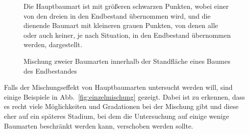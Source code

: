 \documentclass[twocolumn]{scrartcl}
\begin{document}
\begin{figure}[htbp]
  \centering
{}
\caption{Mischung zweier Baumarten innerhalb der Standfläche eines Baumes des Endbestandes}
\footnotesize{Die Hauptbaumart ist mit größeren schwarzen Punkten, wobei einer von den dreien in den Endbestand übernommen wird, und die dienende Baumart mit kleineren grauen Punkten, von denen alle oder auch keiner, je nach Situation, in den Endbestand übernommen werden, dargestellt.}
\label{fig:mischung}
\end{figure}

Falls der Mischungseffekt von Hauptbaumarten untersucht werden will, sind einige
Beispiele in Abb.~\ref{fig:einzelmischung} gezeigt. Dabei ist zu erkennen, dass
es recht viele Möglichkeiten und Gradationen bei der Mischung gibt und diese
eher auf ein späteres Stadium, bei dem die Untersuchung auf einige wenige
Baumarten beschränkt werden kann, verschoben werden sollte.
\end{document}

